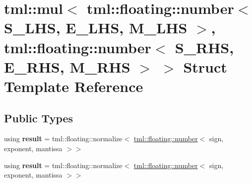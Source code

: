 \hypertarget{structtml_1_1mul_3_01tml_1_1floating_1_1number_3_01S__LHS_00_01E__LHS_00_01M__LHS_01_4_00_01tml_6cdb98003dbb0187b3ecd108f86a2e4f}{\section{tml\+:\+:mul$<$ tml\+:\+:floating\+:\+:number$<$ S\+\_\+\+L\+H\+S, E\+\_\+\+L\+H\+S, M\+\_\+\+L\+H\+S $>$, tml\+:\+:floating\+:\+:number$<$ S\+\_\+\+R\+H\+S, E\+\_\+\+R\+H\+S, M\+\_\+\+R\+H\+S $>$ $>$ Struct Template Reference}
\label{structtml_1_1mul_3_01tml_1_1floating_1_1number_3_01S__LHS_00_01E__LHS_00_01M__LHS_01_4_00_01tml_6cdb98003dbb0187b3ecd108f86a2e4f}
}
\subsection*{Public Types}
\begin{DoxyCompactItemize}
\item 
\hypertarget{structtml_1_1mul_3_01tml_1_1floating_1_1number_3_01S__LHS_00_01E__LHS_00_01M__LHS_01_4_00_01tml_6cdb98003dbb0187b3ecd108f86a2e4f_a24df8453bb21fb39690af6e7aefa05c8}{using {\bfseries result} = tml\+::floating\+::normalize$<$ \hyperlink{structtml_1_1floating_1_1number}{tml\+::floating\+::number}$<$ sign, exponent, mantissa $>$$>$}\label{structtml_1_1mul_3_01tml_1_1floating_1_1number_3_01S__LHS_00_01E__LHS_00_01M__LHS_01_4_00_01tml_6cdb98003dbb0187b3ecd108f86a2e4f_a24df8453bb21fb39690af6e7aefa05c8}

\item 
\hypertarget{structtml_1_1mul_3_01tml_1_1floating_1_1number_3_01S__LHS_00_01E__LHS_00_01M__LHS_01_4_00_01tml_6cdb98003dbb0187b3ecd108f86a2e4f_a24df8453bb21fb39690af6e7aefa05c8}{using {\bfseries result} = tml\+::floating\+::normalize$<$ \hyperlink{structtml_1_1floating_1_1number}{tml\+::floating\+::number}$<$ sign, exponent, mantissa $>$$>$}\label{structtml_1_1mul_3_01tml_1_1floating_1_1number_3_01S__LHS_00_01E__LHS_00_01M__LHS_01_4_00_01tml_6cdb98003dbb0187b3ecd108f86a2e4f_a24df8453bb21fb39690af6e7aefa05c8}

\end{DoxyCompactItemize}
